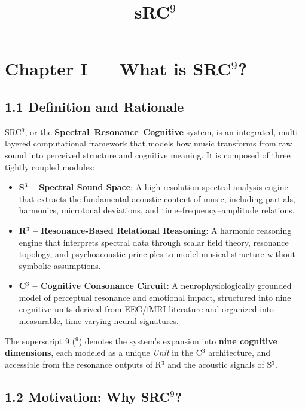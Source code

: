 \documentclass[10pt]{article}
\title{\textbf{sRC$^{9}$ }}
\date{}
\begin{document}
\maketitle
\section*{Chapter I — What is SRC$^{9}$?}

\subsection*{1.1 Definition and Rationale}

SRC$^{9}$, or the \textbf{Spectral–Resonance–Cognitive} system, is an integrated, multi-layered computational framework that models how music transforms from raw sound into perceived structure and cognitive meaning. It is composed of three tightly coupled modules:

\begin{itemize}
    \item \textbf{S$^{3}$ – Spectral Sound Space}: A high-resolution spectral analysis engine that extracts the fundamental acoustic content of music, including partials, harmonics, microtonal deviations, and time–frequency–amplitude relations.
    
    \item \textbf{R$^{3}$ – Resonance-Based Relational Reasoning}: A harmonic reasoning engine that interprets spectral data through scalar field theory, resonance topology, and psychoacoustic principles to model musical structure without symbolic assumptions.
    
    \item \textbf{C$^{3}$ – Cognitive Consonance Circuit}: A neurophysiologically grounded model of perceptual resonance and emotional impact, structured into nine cognitive units derived from EEG/fMRI literature and organized into measurable, time-varying neural signatures.
\end{itemize}

The superscript 9 ($^{9}$) denotes the system's expansion into \textbf{nine cognitive dimensions}, each modeled as a unique \textit{Unit} in the C$^{3}$ architecture, and accessible from the resonance outputs of R$^{3}$ and the acoustic signals of S$^{3}$.

\subsection*{1.2 Motivation: Why SRC$^{9}$?}
\end{document}
